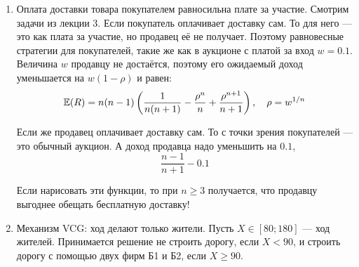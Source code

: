 \begin{enumerate}
\begin{figure}
\hfill
{}
\hfill
{}
\hfill
\end{figure}

\item Оплата доставки товара покупателем равносильна плате за участие. Смотрим задачи из лекции 3. Если покупатель оплачивает доставку сам. То для него — это как плата за участие, но продавец её не получает. Поэтому равновесные стратегии для покупателей, такие же как в аукционе с платой за вход $ w=0.1 $. Величина $ w $ продавцу не достаётся, поэтому его ожидаемый доход уменьшается на $ w(1-\rho) $ и равен:
\begin{equation}
\operatorname{\mathbb{E}}(R)=n(n-1)\left(\frac{1}{n(n+1)}-\frac{\rho^{n}}{n}+\frac{\rho^{n+1}}{n+1}\right),\quad \rho=w^{1/n}
\end{equation}


Если же продавец оплачивает доставку сам. То с точки зрения покупателей — это обычный аукцион. А доход продавца надо уменьшить на $ 0.1 $,
\begin{equation}
\frac{n-1}{n+1}-0.1
\end{equation}

Если нарисовать эти функции, то при $ n\geq 3 $ получается, что продавцу выгоднее обещать бесплатную доставку!

\item Механизм VCG: ход делают только жители. Пусть $ X\in[80;180]$ — ход жителей. Принимается решение не строить дорогу, если $ X<90 $, и строить дорогу с помощью двух фирм Б1 и Б2, если $ X\geq 90 $.


\end{enumerate}
